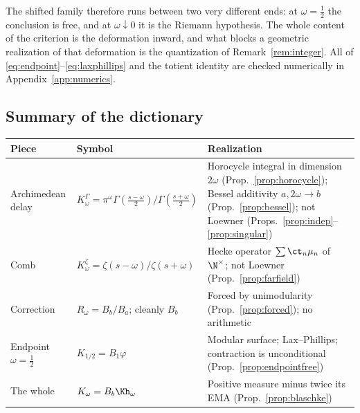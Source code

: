 The shifted family therefore runs between two very different ends: at
$\omega=\frac12$ the conclusion is free, and at $\omega\downarrow0$ it is the
Riemann hypothesis. The whole content of the criterion is the deformation
inward, and what blocks a geometric realization of that deformation is the
quantization of Remark~\ref{rem:integer}. All of
\eqref{eq:endpoint}--\eqref{eq:laxphillips} and the totient identity are
checked numerically in Appendix~\ref{app:numerics}.

\subsection{Summary of the dictionary}

\begin{center}
\small
\begin{tabular}{@{}l l p{6.6cm}@{}}
\toprule
Piece & Symbol & Realization \\
\midrule
Archimedean delay & $K^\Gamma_\omega=\pi^\omega\Gamma(\frac{s-\omega}2)/\Gamma(\frac{s+\omega}2)$ & Horocycle integral in dimension $2\omega$ (Prop.~\ref{prop:horocycle}); Bessel additivity $a,2\omega\to b$ (Prop.~\ref{prop:bessel}); not Loewner (Props.~\ref{prop:indep}--\ref{prop:singular}) \\
Comb & $K^\zeta_\omega=\zeta(s-\omega)/\zeta(s+\omega)$ & Hecke operator $\sum\ct_n\mu_n$ of $\N^\times$; not Loewner (Prop.~\ref{prop:farfield}) \\
Correction & $R_\omega=B_b/B_a$; cleanly $B_b$ & Forced by unimodularity (Prop.~\ref{prop:forced}); no arithmetic \\
Endpoint $\omega=\frac12$ & $K_{1/2}=B_1\varphi$ & Modular surface; Lax--Phillips; contraction is unconditional (Prop.~\ref{prop:endpointfree}) \\
The whole & $K_\omega=B_b\Kh_\omega$ & Positive measure minus twice its EMA (Prop.~\ref{prop:blaschke}) \\
\bottomrule
\end{tabular}
\end{center}
